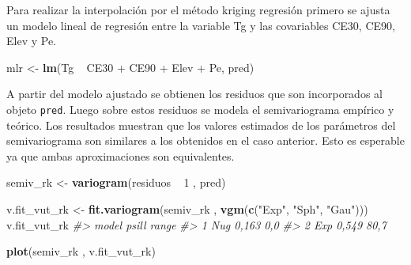 \documentclass[11pt,b5paper,]{krantz}
\newenvironment{Shaded}{}{}
\newcommand{\CommentTok}[1]{\textcolor[rgb]{0.38,0.63,0.69}{\textit{#1}}}
\newcommand{\DecValTok}[1]{\textcolor[rgb]{0.25,0.63,0.44}{#1}}
\newcommand{\KeywordTok}[1]{\textcolor[rgb]{0.00,0.44,0.13}{\textbf{#1}}}
\newcommand{\NormalTok}[1]{#1}
\newcommand{\OperatorTok}[1]{\textcolor[rgb]{0.40,0.40,0.40}{#1}}
\newcommand{\StringTok}[1]{\textcolor[rgb]{0.25,0.44,0.63}{#1}}
\begin{document}
Para realizar la interpolación por el método kriging regresión primero se ajusta un modelo lineal de regresión entre la variable Tg y las covariables CE30, CE90, Elev y Pe.

\begin{Shaded}
\begin{Highlighting}[]
\NormalTok{mlr <-}\StringTok{ }\KeywordTok{lm}\NormalTok{(Tg }\OperatorTok{~}\StringTok{ }\NormalTok{CE30 }\OperatorTok{+}\StringTok{ }\NormalTok{CE90 }\OperatorTok{+}\StringTok{ }\NormalTok{Elev }\OperatorTok{+}\StringTok{ }\NormalTok{Pe, pred)}
\end{Highlighting}
\end{Shaded}

A partir del modelo ajustado se obtienen los residuos que son incorporados al objeto \texttt{pred}. Luego sobre estos residuos se modela el semivariograma empírico y teórico. Los resultados muestran que los valores estimados de los parámetros del semivariograma son similares a los obtenidos en el caso anterior. Esto es esperable ya que ambas aproximaciones son equivalentes.

\begin{Shaded}
\end{Shaded}

\begin{Shaded}
\begin{Highlighting}[]
\NormalTok{semiv_rk <-}\StringTok{ }\KeywordTok{variogram}\NormalTok{(residuos }\OperatorTok{~}\StringTok{ }\DecValTok{1}\NormalTok{ , pred)}

\NormalTok{v.fit_vut_rk <-}\StringTok{ }
\StringTok{  }\KeywordTok{fit.variogram}\NormalTok{(semiv_rk , }
                \KeywordTok{vgm}\NormalTok{(}\KeywordTok{c}\NormalTok{(}\StringTok{"Exp"}\NormalTok{, }\StringTok{"Sph"}\NormalTok{, }\StringTok{"Gau"}\NormalTok{)))}
\NormalTok{v.fit_vut_rk}
\CommentTok{#>   model psill range}
\CommentTok{#> 1   Nug 0,163   0,0}
\CommentTok{#> 2   Exp 0,549  80,7}
\end{Highlighting}
\end{Shaded}

\begin{Shaded}
\begin{Highlighting}[]
\KeywordTok{plot}\NormalTok{(semiv_rk , v.fit_vut_rk)}
\end{Highlighting}
\end{Shaded}
\end{document}
